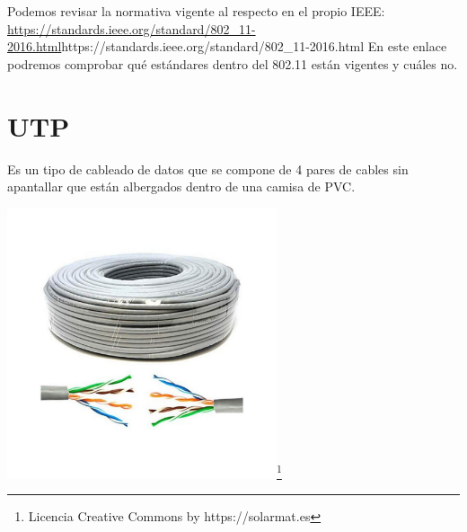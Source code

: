 Podemos revisar la normativa vigente al respecto en el propio IEEE:
\url{https://standards.ieee.org/standard/802_11-2016.html}{https://standards.ieee.org/standard/802_11-2016.html}
En este enlace podremos comprobar qué estándares dentro del 802.11 están vigentes y cuáles no.

\section{UTP}
Es un tipo de cableado de datos que se compone de 4 pares de cables sin apantallar que están albergados dentro de una camisa de PVC.

  \begin{center}
  \includegraphics[width=300]{img/bobina_UTP.pdf}\footnote{Licencia Creative Commons by https://solarmat.es}
  \end{center}

